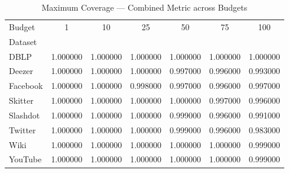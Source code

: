 \begin{table}
\caption{Maximum Coverage — Combined Metric across Budgets}
\label{tab:maximum_coverage}
\begin{tabular}{lcccccc}
\toprule
Budget & 1 & 10 & 25 & 50 & 75 & 100 \\
Dataset &  &  &  &  &  &  \\
\midrule
DBLP & 1.000000 & 1.000000 & 1.000000 & 1.000000 & 1.000000 & 1.000000 \\
Deezer & 1.000000 & 1.000000 & 1.000000 & 0.997000 & 0.996000 & 0.993000 \\
Facebook & 1.000000 & 1.000000 & 0.998000 & 0.997000 & 0.996000 & 0.997000 \\
Skitter & 1.000000 & 1.000000 & 1.000000 & 1.000000 & 0.997000 & 0.996000 \\
Slashdot & 1.000000 & 1.000000 & 1.000000 & 0.999000 & 0.996000 & 0.991000 \\
Twitter & 1.000000 & 1.000000 & 1.000000 & 0.999000 & 0.996000 & 0.983000 \\
Wiki & 1.000000 & 1.000000 & 1.000000 & 1.000000 & 1.000000 & 0.999000 \\
YouTube & 1.000000 & 1.000000 & 1.000000 & 1.000000 & 1.000000 & 0.999000 \\
\bottomrule
\end{tabular}
\end{table}

